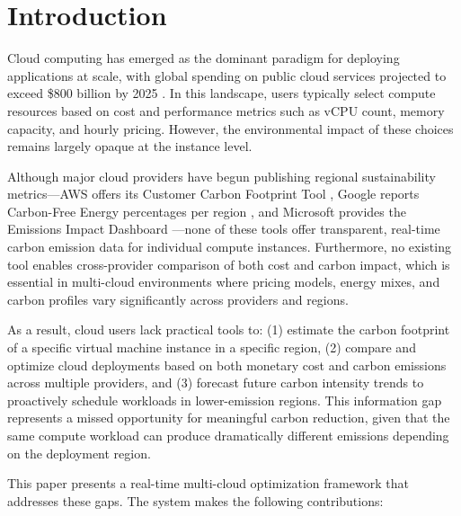 \documentclass[12pt]{article}
\begin{document}
\section{Introduction}

Cloud computing has emerged as the dominant paradigm for deploying applications at scale, with global spending on public cloud services projected to exceed \$800 billion by 2025 \citep{b1}. In this landscape, users typically select compute resources based on cost and performance metrics such as vCPU count, memory capacity, and hourly pricing. However, the environmental impact of these choices remains largely opaque at the instance level.

Although major cloud providers have begun publishing regional sustainability metrics---AWS offers its Customer Carbon Footprint Tool \citep{b2}, Google reports Carbon-Free Energy percentages per region \citep{b3}, and Microsoft provides the Emissions Impact Dashboard \citep{b4}---none of these tools offer transparent, real-time carbon emission data for individual compute instances. Furthermore, no existing tool enables cross-provider comparison of both cost and carbon impact, which is essential in multi-cloud environments where pricing models, energy mixes, and carbon profiles vary significantly across providers and regions.

As a result, cloud users lack practical tools to: (1) estimate the carbon footprint of a specific virtual machine instance in a specific region, (2) compare and optimize cloud deployments based on both monetary cost and carbon emissions across multiple providers, and (3) forecast future carbon intensity trends to proactively schedule workloads in lower-emission regions. This information gap represents a missed opportunity for meaningful carbon reduction, given that the same compute workload can produce dramatically different emissions depending on the deployment region.

This paper presents a real-time multi-cloud optimization framework that addresses these gaps. The system makes the following contributions:
\end{document}
